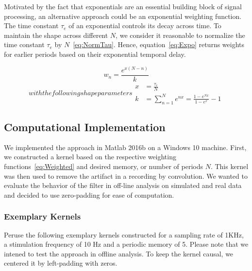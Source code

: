 \documentclass[a4paper]{article}
\begin{document}
Motivated by the fact that exponentials are an essential building block of signal processing, an alternative approach could be an exponential weighting function. The time constant $\tau_e$ of an exponential controls its decay across time. To maintain the shape across different $N$, we consider it reasonable to normalize the time constant $\tau_e$ by $N$~\eqref{eq:NormTau}. Hence, equation~\eqref{eq:Expo} returns weights for earlier periods based on their exponential temporal delay.

\begin{equation}
    w_n = \frac{e^{x(N-n)}}{k}\label{eq:Expo}
\end{equation}
\begin{subequations}
with the following shape parameters
\begin{align}
    x   & = \frac{\tau_e}{N}\label{eq:NormTau}\\
    k   & = \sum_{n=1}^{N}e^{nx} = \frac{1-e^{Nx}}{1-e^{x}}-1
\end{align}
\end{subequations}

\subsection{Computational Implementation}

We implemented the approach in Matlab 2016b on a Windows 10 machine. First, we constructed a kernel based on the respective weighting functions~\eqref{eq:Weighted} and desired memory, or number of periods $N$. This kernel was then used to remove the artifact in a recording by convolution.
We wanted to evaluate the behavior of the filter in off-line analysis on simulated and real data and decided to use zero-padding for ease of computation.

\subsubsection{Exemplary Kernels}
Peruse the following exemplary kernels constructed for a sampling rate of 1KHz, a stimulation frequency of 10 Hz and a periodic memory of 5.  Please note that we intened to test the approach in offline analysis. To keep the kernel causal, we centered it by left-padding with zeros.
\end{document}
